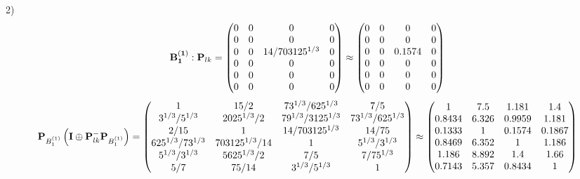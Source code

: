 \documentclass[10pt,a4paper]{article}
\begin{document}
	2)
	\[
		\bold{B_1^{(1)}}: \bold{P}_{lk} = 
		\begin{pmatrix}
			{{0}}{} & {{0}}{} & {{0}}{} & {{0}}{} \\
			{{0}}{} & {{0}}{} & {{0}}{} & {{0}}{} \\
			{{0}}{} & {{0}}{} & {{14}} / {{703125^ {1 / 3}}} & {{0}}{} \\
			{{0}}{} & {{0}}{} & {{0}}{} & {{0}}{} \\
			{{0}}{} & {{0}}{} & {{0}}{} & {{0}}{} \\
			{{0}}{} & {{0}}{} & {{0}}{} & {{0}}{} \\
		\end{pmatrix}
		\approx
		\begin{pmatrix}
			0        & 0        & 0        & 0        \\
			0        & 0        & 0        & 0        \\
			0        & 0        & 0.1574   & 0        \\
			0        & 0        & 0        & 0        \\
			0        & 0        & 0        & 0        \\
			0        & 0        & 0        & 0        \\
		\end{pmatrix}
	\]
	\[
		\bold{P}_{B_1^{(1)}}\left(\bold{I} \oplus \bold{P}_{lk}^{-}\bold{P}_{B_1^{(1)}}\right) = 
		\begin{pmatrix}
			{1}{} & {{15}} / {{2}} & {{7}{3^ {1 / 3}}} / {{625^ {1 / 3}}} & {{7}} / {{5}} \\
			{{3^ {1 / 3}}} / {{5^ {1 / 3}}} & {{2025^ {1 / 3}}} / {{2}} & {{7}{9^ {1 / 3}}} / {{3125^ {1 / 3}}} & {{7}{3^ {1 / 3}}} / {{625^ {1 / 3}}} \\
			{{2}} / {{15}} & {1}{} & {{14}} / {{703125^ {1 / 3}}} & {{14}} / {{75}} \\
			{{625^ {1 / 3}}} / {{7}{3^ {1 / 3}}} & {{703125^ {1 / 3}}} / {{14}} & {1}{} & {{5^ {1 / 3}}} / {{3^ {1 / 3}}} \\
			{{5^ {1 / 3}}} / {{3^ {1 / 3}}} & {{5625^ {1 / 3}}} / {{2}} & {{7}} / {{5}} & {{7}} / {{75^ {1 / 3}}} \\
			{{5}} / {{7}} & {{75}} / {{14}} & {{3^ {1 / 3}}} / {{5^ {1 / 3}}} & {1}{} \\
		\end{pmatrix}
		\approx
		\begin{pmatrix}
			1        & 7.5      & 1.181    & 1.4      \\
			0.8434   & 6.326    & 0.9959   & 1.181    \\
			0.1333   & 1        & 0.1574   & 0.1867   \\
			0.8469   & 6.352    & 1        & 1.186    \\
			1.186    & 8.892    & 1.4      & 1.66     \\
			0.7143   & 5.357    & 0.8434   & 1        \\
		\end{pmatrix}
	\]
\end{document}
